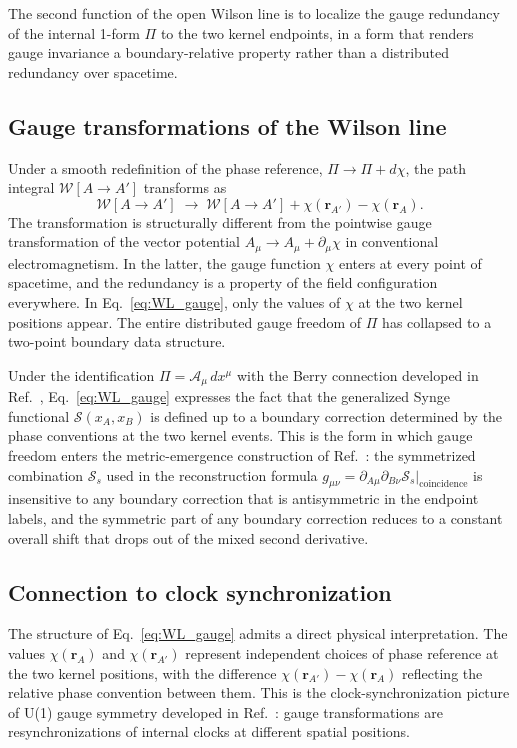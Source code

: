 \documentclass[%
 reprint, amsmath,amssymb, aps, prb, ]{revtex4-2}
\numberwithin{equation}{section}
\newcommand{\WL}{\mathcal{W}}
\begin{document}
The second function of the open Wilson line is to localize the gauge redundancy of the internal 1-form $\Pi$ to the two kernel endpoints, in a form that renders gauge invariance a boundary-relative property rather than a distributed redundancy over spacetime.

\subsection{Gauge transformations of the Wilson line}

Under a smooth redefinition of the phase reference, $\Pi \to \Pi + d\chi$, the path integral $\WL[A\to A']$ transforms as
\begin{equation}
\WL[A\to A'] \;\to\; \WL[A\to A'] + \chi(\mathbf{r}_{A'}) - \chi(\mathbf{r}_A).
\label{eq:WL_gauge}
\end{equation}
The transformation is structurally different from the pointwise gauge transformation of the vector potential $A_\mu \to A_\mu + \partial_\mu \chi$ in conventional electromagnetism. In the latter, the gauge function $\chi$ enters at every point of spacetime, and the redundancy is a property of the field configuration everywhere. In Eq.~\eqref{eq:WL_gauge}, only the values of $\chi$ at the two kernel positions appear. The entire distributed gauge freedom of $\Pi$ has collapsed to a two-point boundary data structure.

Under the identification $\Pi = \mathcal{A}_\mu\,dx^\mu$ with the Berry connection developed in Ref.~\cite{hanamura51}, Eq.~\eqref{eq:WL_gauge} expresses the fact that the generalized Synge functional $\mathcal{S}(x_A, x_B)$ is defined up to a boundary correction determined by the phase conventions at the two kernel events. This is the form in which gauge freedom enters the metric-emergence construction of Ref.~\cite{hanamura51}: the symmetrized combination $\mathcal{S}_s$ used in the reconstruction formula $g_{\mu\nu} = \partial_{A\mu}\partial_{B\nu}\mathcal{S}_s|_{\text{coincidence}}$ is insensitive to any boundary correction that is antisymmetric in the endpoint labels, and the symmetric part of any boundary correction reduces to a constant overall shift that drops out of the mixed second derivative.

\subsection{Connection to clock synchronization}

The structure of Eq.~\eqref{eq:WL_gauge} admits a direct physical interpretation. The values $\chi(\mathbf{r}_A)$ and $\chi(\mathbf{r}_{A'})$ represent independent choices of phase reference at the two kernel positions, with the difference $\chi(\mathbf{r}_{A'}) - \chi(\mathbf{r}_A)$ reflecting the relative phase convention between them. This is the clock-synchronization picture of U(1) gauge symmetry developed in Ref.~\cite{hanamura17}: gauge transformations are resynchronizations of internal clocks at different spatial positions.
\end{document}
